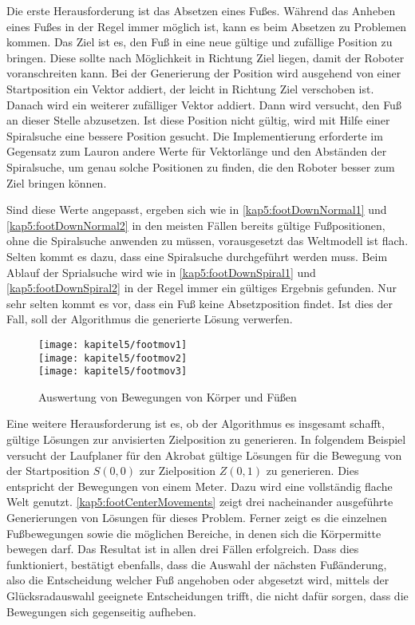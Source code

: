 Die erste Herausforderung ist das Absetzen eines Fußes. Während das Anheben eines Fußes in der Regel immer möglich ist, kann es beim Absetzen zu Problemen kommen. Das Ziel ist es, den Fuß in eine neue gültige und zufällige Position zu bringen. Diese sollte nach Möglichkeit in Richtung Ziel liegen, damit der Roboter voranschreiten kann. Bei der Generierung der Position wird ausgehend von einer Startposition ein Vektor addiert, der leicht in Richtung Ziel verschoben ist. Danach wird ein weiterer zufälliger Vektor addiert. Dann wird versucht, den Fuß an dieser Stelle abzusetzen. Ist diese Position nicht gültig, wird mit Hilfe einer Spiralsuche eine bessere Position gesucht. Die Implementierung erforderte im Gegensatz zum Lauron andere Werte für Vektorlänge und den Abständen der Spiralsuche, um genau solche Positionen zu finden, die den Roboter besser zum Ziel bringen können.

Sind diese Werte angepasst, ergeben sich wie in \autoref{kap5:footDownNormal1} und \autoref{kap5:footDownNormal2} in den meisten Fällen bereits gültige Fußpositionen, ohne die Spiralsuche anwenden zu müssen, vorausgesetzt das Weltmodell ist flach. Selten kommt es dazu, dass eine Spiralsuche durchgeführt werden muss. Beim Ablauf der Sprialsuche wird wie in \autoref{kap5:footDownSpiral1} und \autoref{kap5:footDownSpiral2} in der Regel immer ein gültiges Ergebnis gefunden. Nur sehr selten kommt es vor, dass ein Fuß keine Absetzposition findet. Ist dies der Fall, soll der Algorithmus die generierte Lösung verwerfen.

\begin{figure}[b!]
    \begin{center}
    \texttt{[image: kapitel5/footmov1]}\hfill
    \\[\smallskipamount]
    \texttt{[image: kapitel5/footmov2]}\hfill
    \\[\smallskipamount]
    \texttt{[image: kapitel5/footmov3]}\hfill
    \caption{Auswertung von Bewegungen von Körper und Füßen}\label{kap5:footCenterMovements}
    \end{center}
\end{figure}

Eine weitere Herausforderung ist es, ob der Algorithmus es insgesamt schafft, gültige Lösungen zur anvisierten Zielposition zu generieren. In folgendem Beispiel versucht der Laufplaner für den Akrobat gültige Lösungen für die Bewegung von der Startposition $S(0,0)$ zur Zielposition $Z(0,1)$ zu generieren. Dies entspricht der Bewegungen von einem Meter. Dazu wird eine vollständig flache Welt genutzt. \autoref{kap5:footCenterMovements} zeigt drei nacheinander ausgeführte Generierungen von Lösungen für dieses Problem. Ferner zeigt es die einzelnen Fußbewegungen sowie die möglichen Bereiche, in denen sich die Körpermitte bewegen darf. Das Resultat ist in allen drei Fällen erfolgreich. Dass dies funktioniert, bestätigt ebenfalls, dass die Auswahl der nächsten Fußänderung, also die Entscheidung welcher Fuß angehoben oder abgesetzt wird, mittels der Glücksradauswahl geeignete Entscheidungen trifft, die nicht dafür sorgen, dass die Bewegungen sich gegenseitig aufheben.